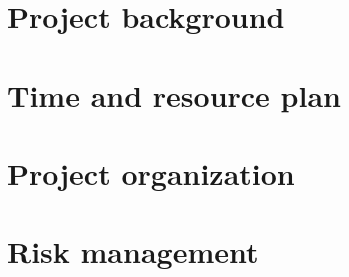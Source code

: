 \documentclass[12pt]{article}
\begin{document}
    \section{Project background}
    
    \clearpage
    \section{Time and resource plan}
    
\clearpage
    \section{Project organization}
    
\clearpage
    \section{Risk management}
    
    
\end{document}
